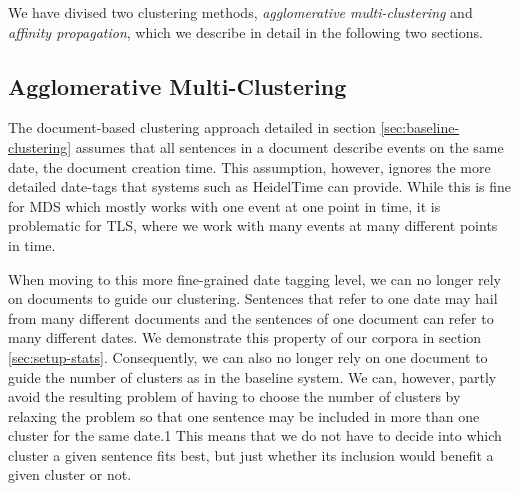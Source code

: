\documentclass[a4paper,BCOR=10mm]{report}
\numberwithin{lemma}{chapter}
\numberwithin{definition}{chapter}
\begin{document}
We have divised two clustering methods, \textit{agglomerative multi-clustering} and \textit{affinity propagation}, which we describe in detail in the following two sections.

%
%

\subsection{Agglomerative Multi-Clustering}

The document-based clustering approach detailed in section \ref{sec:baseline-clustering} assumes that all sentences in a document describe events on the same date, the document creation time. This assumption, however, ignores the more detailed date-tags that systems such as HeidelTime \citep{heideltime} can provide. While this is fine for MDS which mostly works with one event at one point in time, it is problematic for TLS, where we work with many events at many different points in time.

When moving to this more fine-grained date tagging level, we can no longer rely on documents to guide our clustering. Sentences that refer to one date may hail from many different documents and the sentences of one document can refer to many different dates. We demonstrate this property of our corpora in section \ref{sec:setup-stats}.
Consequently, we can also no longer rely on one document to guide the number of clusters as in the baseline system. We can, however, partly avoid the resulting problem of having to choose the number of clusters by relaxing the problem so that one sentence may be included in more than one cluster for the same date.1
This means that we do not have to decide into which cluster a given sentence fits best, but just whether its inclusion would benefit a given cluster or not.
\end{document}
